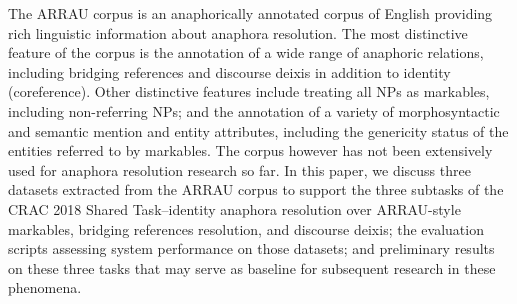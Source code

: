 The ARRAU corpus is an anaphorically annotated corpus of English providing rich linguistic information about anaphora resolution. The most distinctive feature of the corpus is the annotation of a wide range of anaphoric relations, including bridging references  and discourse deixis in addition to identity (coreference). Other distinctive  features include treating all NPs as markables, including non-referring NPs; and the annotation of a variety of morphosyntactic and semantic mention and entity attributes, including the genericity status of the entities referred to by markables. The corpus however has not been extensively used for anaphora resolution research so far. In this paper, we discuss three datasets extracted from the ARRAU  corpus to support the three subtasks of the CRAC 2018 Shared Task--identity anaphora resolution over ARRAU-style markables, bridging references resolution, and discourse deixis; the evaluation scripts assessing system performance on those datasets; and preliminary results on these three tasks that may serve as baseline for subsequent research in these phenomena.
